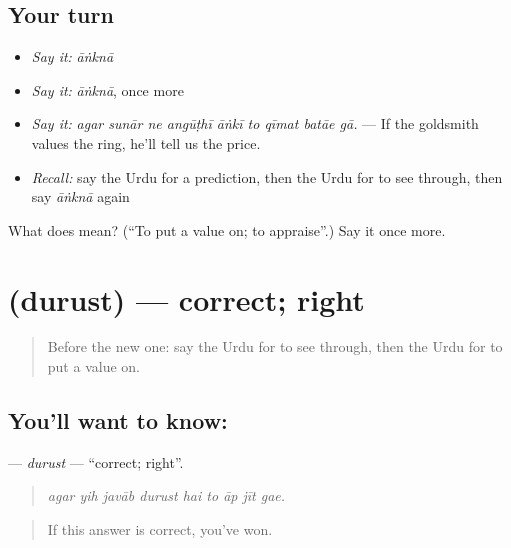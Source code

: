 \subsection*{Your turn}
\begin{itemize}
\raggedright
  \item \emph{Say it:} \emph{āṅknā}
  \item \emph{Say it:} \emph{āṅknā}, once more
  \item \emph{Say it:} \emph{agar sunār ne angūṭhī āṅkī to qīmat batāe gā.} — If the goldsmith values the ring, he'll tell us the price.
  \item \emph{Recall:} say the Urdu for a prediction, then the Urdu for to see through, then say \emph{āṅknā} again
\end{itemize}

\begin{tcolorbox}[breakable,colback=teal!4,colframe=teal!35!black,title={Before you move on}]
What does  mean? (\textquotedblleft{}To put a value on; to appraise\textquotedblright{}.) Say it once more.
\end{tcolorbox}
\section[\texorpdfstring{\ur{درست} (durust)}{درست (durust)}]{ (durust) — correct; right}

\label{lesson:UR-C543-durust}



\begin{quote}
Before the new one: say the Urdu for to see through, then the Urdu for to put a value on.
\end{quote}

\subsection*{You'll want to know: }
\textbf{} — \emph{durust} — \textquotedblleft{}correct; right\textquotedblright{}.

\begin{quote}
        
\end{quote}

\begin{quote}
\emph{agar yih javāb durust hai to āp jīt gae.}
\end{quote}

\begin{quote}
If this answer is correct, you've won.
\end{quote}

